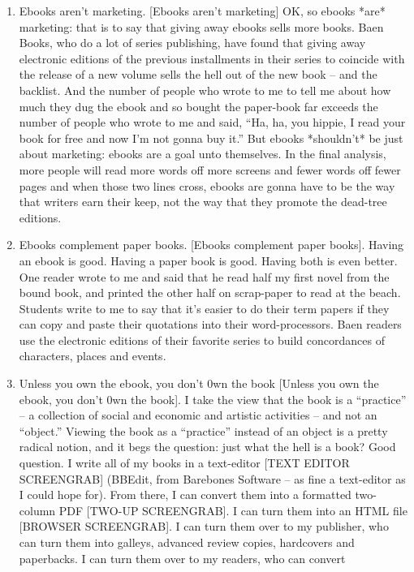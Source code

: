 \begin{enumerate}
\item
  Ebooks aren't marketing. [Ebooks aren't marketing] OK, so ebooks
  *are* marketing: that is to say that giving away ebooks sells more
  books. Baen Books, who do a lot of series publishing, have found
  that giving away electronic editions of the previous installments
  in their series to coincide with the release of a new volume sells
  the hell out of the new book -- and the backlist. And the number of
  people who wrote to me to tell me about how much they dug the ebook
  and so bought the paper-book far exceeds the number of people who
  wrote to me and said, ``Ha, ha, you hippie, I read your book for
  free and now I'm not gonna buy it.'' But ebooks *shouldn't* be just
  about marketing: ebooks are a goal unto themselves. In the final
  analysis, more people will read more words off more screens and
  fewer words off fewer pages and when those two lines cross, ebooks
  are gonna have to be the way that writers earn their keep, not the
  way that they promote the dead-tree editions.
\item
  Ebooks complement paper books. [Ebooks complement paper books].
  Having an ebook is good. Having a paper book is good. Having both
  is even better. One reader wrote to me and said that he read half
  my first novel from the bound book, and printed the other half on
  scrap-paper to read at the beach. Students write to me to say that
  it's easier to do their term papers if they can copy and paste
  their quotations into their word-processors. Baen readers use the
  electronic editions of their favorite series to build concordances
  of characters, places and events.
\item
  Unless you own the ebook, you don't 0wn the book [Unless you own
  the ebook, you don't 0wn the book]. I take the view that the book
  is a ``practice'' -- a collection of social and economic and artistic
  activities -- and not an ``object.'' Viewing the book as a ``practice''
  instead of an object is a pretty radical notion, and it begs the
  question: just what the hell is a book? Good question. I write all
  of my books in a text-editor [TEXT EDITOR SCREENGRAB] (BBEdit, from
  Barebones Software -- as fine a text-editor as I could hope for).
  From there, I can convert them into a formatted two-column PDF
  [TWO-UP SCREENGRAB]. I can turn them into an HTML file [BROWSER
  SCREENGRAB]. I can turn them over to my publisher, who can turn
  them into galleys, advanced review copies, hardcovers and
  paperbacks. I can turn them over to my readers, who can convert

\end{enumerate}
